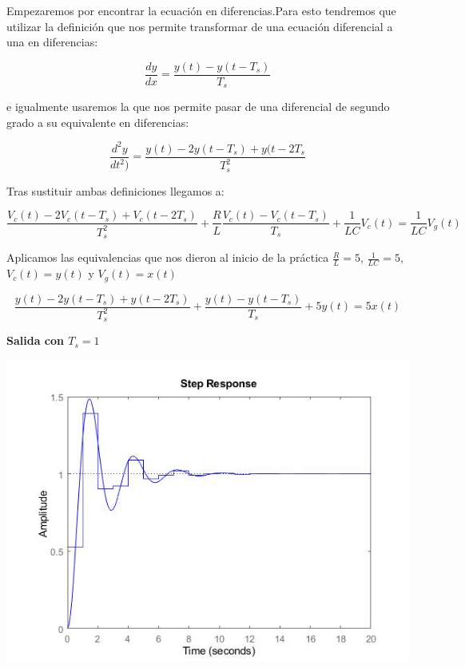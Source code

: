 Empezaremos por encontrar la ecuación en diferencias.Para esto tendremos que utilizar la definición que nos permite transformar de una ecuación diferencial a una en diferencias:

\begin{equation}
\frac{dy}{dx}=\frac{y(t)-y(t-T_s)}{T_s}
\end{equation}

\noindent e igualmente usaremos la que nos permite pasar de una diferencial de segundo grado a su equivalente en diferencias:

\begin{equation}
\frac{d^2y}{dt^2)}=\frac{y(t)-2y(t-T_s)+y(t-2T_s}{T_s^2}
\end{equation}

\noindent Tras sustituir ambas definiciones llegamos a:

\begin{equation}
\frac{V_c(t)-2V_c(t-T_s)+V_c(t-2T_s)}{T_s^2}+\frac{R}{L}\frac{V_c(t)-V_c(t-T_s)}{T_s}+\frac{1}{LC}V_c(t)=\frac{1}{LC}V_g(t)
\end{equation}

\noindent Aplicamos las equivalencias que nos dieron al inicio de la práctica $\frac{R}{L}=5$, $\frac{1}{LC}=5$, $V_c(t)=y(t)$ y $V_g(t)=x(t)$

\begin{equation}
\frac{y(t)-2y(t-T_s)+y(t-2T_s)}{T_s^2}+\frac{y(t)-y(t-T_s)}{T_s}+5y(t)=5x(t)
\end{equation}

\noindent \textbf{Salida con $T_s=1$}

\noindent \includegraphics[scale=0.6]{./ImagenParte1y2/SalidaTs1}


